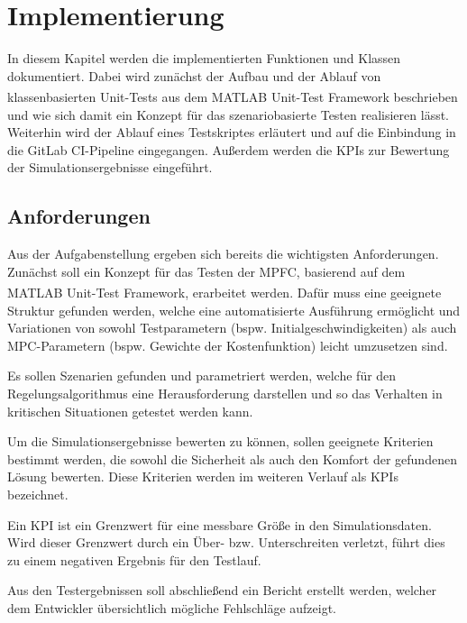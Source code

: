 \chapter{Implementierung} \label{chap:Implementierung}
\thispagestyle{empty}
In diesem Kapitel werden die implementierten Funktionen und Klassen dokumentiert. Dabei wird zunächst der Aufbau und der Ablauf von klassenbasierten Unit-Tests aus dem MATLAB\textsuperscript{\textregistered} Unit-Test Framework beschrieben und wie sich damit ein Konzept für das szenariobasierte Testen realisieren lässt. Weiterhin wird der Ablauf eines Testskriptes erläutert und auf die Einbindung in die GitLab CI-Pipeline eingegangen. Außerdem werden die KPIs zur Bewertung der Simulationsergebnisse eingeführt.

\section{Anforderungen} \label{sec:Anforderungen}
Aus der Aufgabenstellung ergeben sich bereits die wichtigsten Anforderungen. Zunächst soll ein Konzept für das Testen der MPFC, basierend auf dem MATLAB\textsuperscript{\textregistered} Unit-Test Framework, erarbeitet werden. Dafür muss eine geeignete Struktur gefunden werden, welche eine automatisierte Ausführung ermöglicht und Variationen von sowohl Testparametern (bspw. Initialgeschwindigkeiten) als auch MPC-Parametern (bspw. Gewichte der Kostenfunktion) leicht umzusetzen sind. 

Es sollen Szenarien gefunden und parametriert werden, welche für den Regelungsalgorithmus eine Herausforderung darstellen und so das Verhalten in kritischen Situationen getestet werden kann.

Um die Simulationsergebnisse bewerten zu können, sollen geeignete Kriterien bestimmt werden, die sowohl die Sicherheit als auch den Komfort der gefundenen Lösung bewerten. Diese Kriterien werden im weiteren Verlauf als KPIs bezeichnet. 

Ein KPI ist ein Grenzwert für eine messbare Größe in den Simulationsdaten. Wird dieser Grenzwert durch ein Über- bzw. Unterschreiten verletzt, führt dies zu einem negativen Ergebnis für den Testlauf.

Aus den Testergebnissen soll abschließend ein Bericht erstellt werden, welcher dem Entwickler übersichtlich mögliche Fehlschläge aufzeigt.

